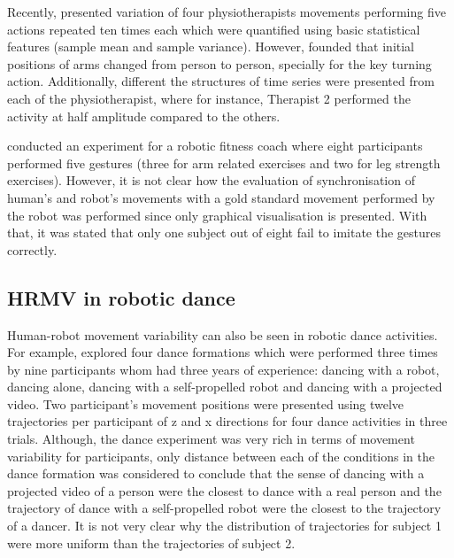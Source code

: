 Recently, \cite{guneysu2015} presented variation of four physiotherapists movements performing 
five actions repeated ten times each which were quantified using basic statistical features 
(sample mean and sample variance). However, \cite{guneysu2015} founded that initial 
positions of arms changed from person to person, specially for the key turning action. 
Additionally, different the structures of time series were presented from each of the 
physiotherapist, where for instance, Therapist 2 performed the activity at half amplitude 
compared to the others.


\cite{gorer2013} conducted an experiment for a robotic fitness coach where 
eight participants performed five gestures 
(three for arm related exercises and two for leg strength exercises).
However, it is not clear how the evaluation of 
synchronisation of human's and robot's movements 
with a gold standard movement performed by the robot
was performed since only graphical visualisation
is presented. With that, it was stated that only one subject 
out of eight fail to imitate the gestures correctly.


\subsection{HRMV in robotic dance}


Human-robot movement variability can also be seen in robotic dance activities.
For example, \cite{tsuchida2013} explored four dance formations which were performed 
three times by nine participants whom had three years of experience: 
dancing with a robot, dancing alone, dancing with a self-propelled robot and dancing with a projected video.
Two participant's movement positions were presented using twelve trajectories 
per participant of z and x directions for four dance activities 
in three trials.
Although, the dance experiment was very rich in terms of movement variability
for participants, only distance between each of the conditions in the dance formation 
was considered to conclude that the sense of dancing with a projected video of a person 
were the closest to dance with a real person and the trajectory of dance with a 
self-propelled robot were the closest to the trajectory of a dancer.
It is not very clear why the distribution of trajectories for subject 1 were 
more uniform than the trajectories of subject 2.


